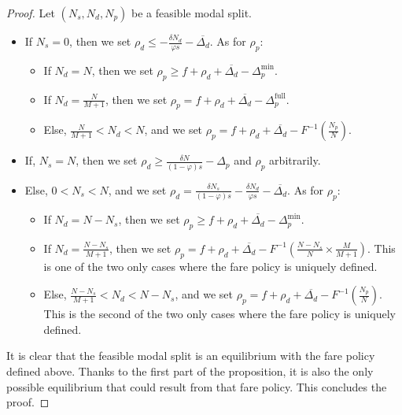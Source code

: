 \documentclass[english, a4paper]{article}
\theoremstyle{plain}
\theoremstyle{definition}
\theoremstyle{remark}
\begin{document}
\begin{proof}
    Let $(N_s, N_d, N_p)$ be a feasible modal split.

    \begin{itemize}
        \item If $N_s = 0$, then we set $\rho _d \leq -\frac{\delta N_d}{\varphi s} - \overline{\Delta _d}$. As for $\rho _p$:
        \begin{itemize}
            \item If $N_d = N$, then we set $\rho _p \geq f + \rho _d + \overline{\Delta _d} - \Delta _p^{\text{min}}$.
            \item If $N_d = \frac{N}{M+1}$, then we set $\rho _p = f + \rho _d + \overline{\Delta _d} - \Delta _p^{\text{full}}$.
            \item Else, $\frac{N}{M+1} < N_d < N$, and we set $\rho _p = f + \rho _d + \overline{\Delta _d} - F^{-1}\left(\frac{N _p}{N} \right)$.
        \end{itemize}
        \item If, $N_s = N$, then we set $\rho _d \geq \frac{\delta N}{(1-\varphi)s} - \Delta _p$ and $\rho _p$ arbitrarily.
        \item Else, $0 < N_s < N$, and we set $\rho _d = \frac{\delta N_s}{(1-\varphi)s} - \frac{\delta N_d}{\varphi s} - \overline{\Delta _d}$. As for $\rho _p$:
        \begin{itemize}
            \item If $N_d = N - N_s$, then we set $\rho _p \geq f + \rho_d + \overline{\Delta _d} - \Delta _p ^{\text{min}}$.
            \item If $N_d = \frac{N - N_s}{M+1}$, then we set $\rho _p = f + \rho _d + \overline{\Delta _d} - F^{-1}\left( \frac{N - N_s}{N} \times \frac{M}{M+1} \right)$. This is one of the two only cases where the fare policy is uniquely defined.
            \item Else, $\frac{N - N_s}{M+1} < N_d < N - N_s$, and we set $\rho _p = f + \rho _d + \overline{\Delta _d} - F^{-1}\left(\frac{N _p}{N} \right)$. This is the second of the two only cases where the fare policy is uniquely defined.
        \end{itemize}
    \end{itemize}

    It is clear that the feasible modal split is an equilibrium with the fare policy defined above. Thanks to the first part of the proposition, it is also the only possible equilibrium that could result from that fare policy. This concludes the proof.
    

\end{proof}
\end{document}
